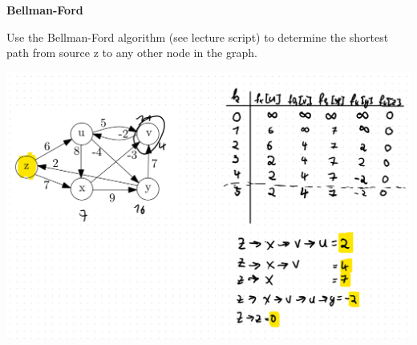 \question \textbf{Bellman-Ford}

Use the Bellman-Ford algorithm (see lecture script) to determine the shortest path from source z to any other node in the graph.

\begin{solution}
    \includegraphics[width=0.8\linewidth]{task_2/sheet09_a2.png}
    
\end{solution}


